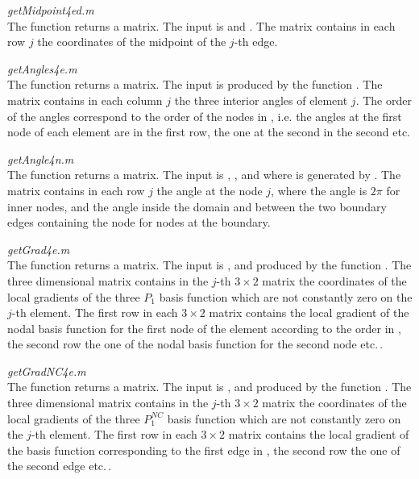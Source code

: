\noindent\emph{getMidpoint4ed.m}\smallskip\\
The function  returns a \code{[nrEdges 2]} matrix. The input is  and . The matrix contains in each row $j$ the coordinates of the midpoint of the $j$-th edge.\bigskip


\noindent\emph{getAngles4e.m}\smallskip\\
The function  returns a \code{[3 nrElems]} matrix. The input is  produced by the function . The matrix contains in each column $j$ the three interior angles of element $j$. The order of the angles correspond to the order of the nodes in , i.e. the angles at the first node of each element are in the first row, the one at the second in the second etc.\bigskip


\noindent\emph{getAngle4n.m}\smallskip\\
The function  returns a \code{[nrNodes 1]} matrix. The input is , ,  and 
where  is generated by . The matrix contains in each row $j$ the angle at the node $j$, where the angle is $2\pi$ for inner nodes, and the angle inside the domain and between the two boundary edges containing the node for nodes at the boundary.\bigskip


\noindent\emph{getGrad4e.m}\smallskip\\
The function  returns a \code{[3 2 nrElems]} matrix. The input is ,  and  produced by the function . The three dimensional matrix contains in the $j$-th $3 \times 2$ matrix the coordinates of the local gradients of the three $P_1$ basis function which are not constantly zero on the $j$-th element. The first row in each $3 \times 2$ matrix contains the local gradient of the nodal basis function for the first node of the element according to the order in , the second row the one of the nodal basis function for the second node etc.\,.\bigskip


\noindent\emph{getGradNC4e.m}\smallskip\\
The function  returns a \code{[3 2 nrElems]} matrix. The input is ,  and  produced by the function . The three dimensional matrix contains in the $j$-th $3 \times 2$ matrix the coordinates of the local gradients of the three $P_1^{NC}$ basis function which are not constantly zero on the $j$-th element. The first row in each $3 \times 2$ matrix contains the local gradient of the basis function corresponding to the first edge in , the second row the one of the second edge etc.\,.